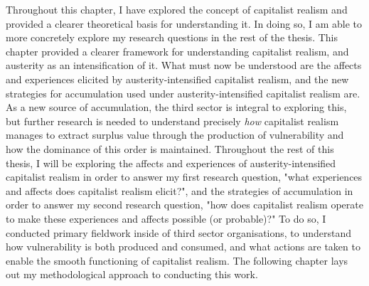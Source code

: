 Throughout this chapter, I have explored the concept of capitalist realism and provided a clearer theoretical basis for understanding it. In doing so, I am able to more concretely explore my research questions in the rest of the thesis. This chapter provided a clearer framework for understanding capitalist realism, and austerity as an intensification of it. What must now be understood are the affects and experiences elicited by austerity-intensified capitalist realism, and the new strategies for accumulation used under austerity-intensified capitalist realism are. As a new source of accumulation, the third sector is integral to exploring this, but further research is needed to understand precisely \emph{how} capitalist realism manages to extract surplus value through the production of vulnerability and how the dominance of this order is maintained. Throughout the rest of this thesis, I will be exploring the affects and experiences of austerity-intensified capitalist realism in order to answer my first research question, "what experiences and affects does capitalist realism elicit?", and the strategies of accumulation in order to answer my second research question, "how does capitalist realism operate to make these experiences and affects possible (or probable)?" To do so, I conducted primary fieldwork inside of third sector organisations, to understand how vulnerability is both produced and consumed, and what actions are taken to enable the smooth functioning of capitalist realism. The following chapter lays out my methodological approach to conducting this work.